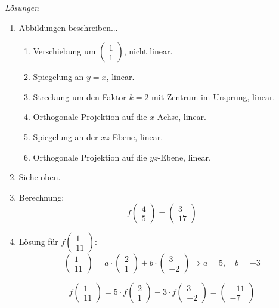 \clearpage
\emph{Lösungen}
\begin{enumerate}
    \item Abbildungen beschreiben...
    \begin{enumerate}
        \item Verschiebung um \( \begin{pmatrix} 1 \\ 1 \end{pmatrix} \), nicht linear.
        \item Spiegelung an \( y = x \), linear.
        \item Streckung um den Faktor \( k=2 \) mit Zentrum im Ursprung, linear.
        \item Orthogonale Projektion auf die $x$-Achse, linear.
        \item Spiegelung an der $xz$-Ebene, linear.
        \item Orthogonale Projektion auf die $yz$-Ebene, linear.
    \end{enumerate}
    
    \item Siehe oben.

    \item Berechnung:
    \[
    f \begin{pmatrix} 4 \\ 5 \end{pmatrix} = \begin{pmatrix} 3 \\ 17 \end{pmatrix}
    \]

    \item Lösung für \( f \begin{pmatrix} 1 \\ 11 \end{pmatrix} \):
    \[
    \begin{pmatrix} 1 \\ 11 \end{pmatrix} = a \cdot \begin{pmatrix} 2 \\ 1 \end{pmatrix} + b \cdot \begin{pmatrix} 3 \\ -2 \end{pmatrix} \Rightarrow a = 5, \quad b = -3
    \]

    \[
    f \begin{pmatrix} 1 \\ 11 \end{pmatrix} = 5 \cdot f \begin{pmatrix} 2 \\ 1 \end{pmatrix} - 3 \cdot f \begin{pmatrix} 3 \\ -2 \end{pmatrix} = \begin{pmatrix} -11 \\ -7 \end{pmatrix}
    \]


\end{enumerate}
